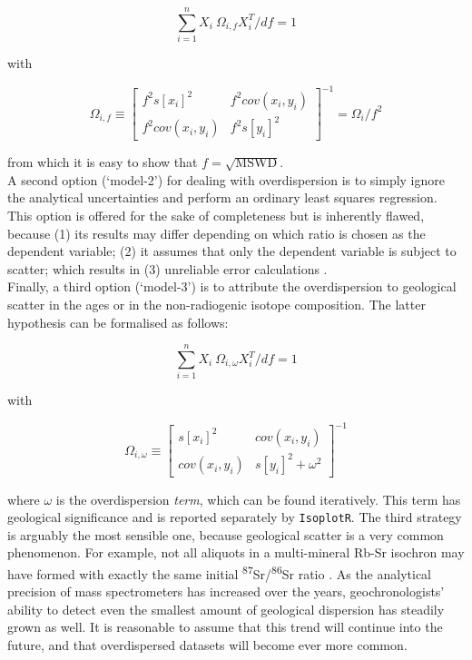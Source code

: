 \documentclass{article}
\begin{document}
\[
\sum\limits_{i=1}^{n} X_i~\Omega_{i,f} X_i^T / df = 1
\]

\noindent with

\[
\Omega_{i,f}
\equiv
\left[
  \begin{array}{cc}
    f^2s[x_i]^2 & f^2cov(x_i,y_i) \\
    f^2cov(x_i,y_i) & f^2s[y_i]^2
  \end{array}
\right]^{-1}
= \Omega_i/f^2
\]

\noindent from which it is easy to show that $f=\sqrt{\mathrm{MSWD}}$.\\


A second option (`model-2') for dealing with overdispersion is to
simply ignore the analytical uncertainties and perform an ordinary
least squares regression. This option is offered for the sake of
completeness but is inherently flawed, because (1) its results may
differ depending on which ratio is chosen as the dependent variable;
(2) it assumes that only the dependent variable is subject to scatter;
which results in (3) unreliable error calculations
\citep[][p. 648]{ludwig2003b}. \\

Finally, a third option (`model-3') is to attribute the overdispersion
to geological scatter in the ages or in the non-radiogenic isotope
composition. The latter hypothesis can be formalised as follows:

\[
\sum\limits_{i=1}^{n} X_i~\Omega_{i,\omega} X_i^T / df = 1
\]

\noindent with

\[
\Omega_{i,\omega} \equiv
\left[
  \begin{array}{cc}
    s[x_i]^2 & cov(x_i,y_i) \\
    cov(x_i,y_i) &  s[y_i]^2 + \omega^2
  \end{array}
\right]^{-1}
\]

\noindent where $\omega$ is the overdispersion \emph{term}, which can
be found iteratively. This term has geological significance and is
reported separately by \texttt{IsoplotR}. The third strategy is
arguably the most sensible one, because geological scatter is a very
common phenomenon.  For example, not all aliquots in a multi-mineral
Rb-Sr isochron may have formed with exactly the same initial
\textsuperscript{87}Sr/\textsuperscript{86}Sr ratio
\citep{mcintyre1966}. As the analytical precision of mass
spectrometers has increased over the years, geochronologists' ability
to detect even the smallest amount of geological dispersion has
steadily grown as well. It is reasonable to assume that this trend
will continue into the future, and that overdispersed datasets will
become ever more common.\\
\end{document}
